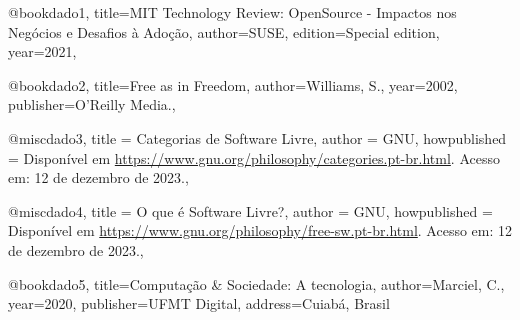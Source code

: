 @book{dado1,
  title={MIT Technology Review: OpenSource - Impactos nos Negócios e Desafios à Adoção},
  author={SUSE},
  edition={Special edition},
  year={2021},
}

@book{dado2,
  title={Free as in Freedom},
  author={Williams, S.},
  year={2002},
  publisher={O'Reilly Media.},
}

@misc{dado3,
  title = {Categorias de Software Livre},
  author = {GNU},
  howpublished = {Disponível em \url{https://www.gnu.org/philosophy/categories.pt-br.html}. Acesso em: 12 de dezembro de 2023.},
}

@misc{dado4,
  title = {O que é Software Livre?},
  author = {GNU},
  howpublished = {Disponível em \url{https://www.gnu.org/philosophy/free-sw.pt-br.html}. Acesso em: 12 de dezembro de 2023.},
}

@book{dado5,
  title={Computação & Sociedade: A tecnologia},
  author={Marciel, C.},
  year={2020},
  publisher={UFMT Digital},
  address={Cuiabá, Brasil}
}




